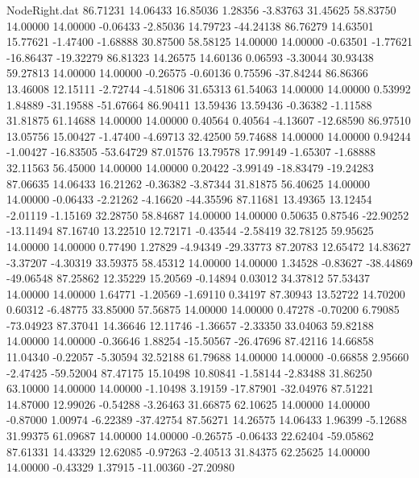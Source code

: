 \begin{filecontents}{NodeRight.dat}
  86.71231   14.06433   16.85036     1.28356   -3.83763   31.45625   58.83750   14.00000   14.00000   -0.06433   -2.85036   14.79723  -44.24138
  86.76279   14.63501   15.77621    -1.47400   -1.68888   30.87500   58.58125   14.00000   14.00000   -0.63501   -1.77621  -16.86437  -19.32279
  86.81323   14.26575   14.60136     0.06593   -3.30044   30.93438   59.27813   14.00000   14.00000   -0.26575   -0.60136    0.75596  -37.84244
  86.86366   13.46008   12.15111    -2.72744   -4.51806   31.65313   61.54063   14.00000   14.00000    0.53992    1.84889  -31.19588  -51.67664
  86.90411   13.59436   13.59436    -0.36382   -1.11588   31.81875   61.14688   14.00000   14.00000    0.40564    0.40564   -4.13607  -12.68590
  86.97510   13.05756   15.00427    -1.47400   -4.69713   32.42500   59.74688   14.00000   14.00000    0.94244   -1.00427  -16.83505  -53.64729
  87.01576   13.79578   17.99149    -1.65307   -1.68888   32.11563   56.45000   14.00000   14.00000    0.20422   -3.99149  -18.83479  -19.24283
  87.06635   14.06433   16.21262    -0.36382   -3.87344   31.81875   56.40625   14.00000   14.00000   -0.06433   -2.21262   -4.16620  -44.35596
  87.11681   13.49365   13.12454    -2.01119   -1.15169   32.28750   58.84687   14.00000   14.00000    0.50635    0.87546  -22.90252  -13.11494
  87.16740   13.22510   12.72171    -0.43544   -2.58419   32.78125   59.95625   14.00000   14.00000    0.77490    1.27829   -4.94349  -29.33773
  87.20783   12.65472   14.83627    -3.37207   -4.30319   33.59375   58.45312   14.00000   14.00000    1.34528   -0.83627  -38.44869  -49.06548
  87.25862   12.35229   15.20569    -0.14894    0.03012   34.37812   57.53437   14.00000   14.00000    1.64771   -1.20569   -1.69110    0.34197
  87.30943   13.52722   14.70200     0.60312   -6.48775   33.85000   57.56875   14.00000   14.00000    0.47278   -0.70200    6.79085  -73.04923
  87.37041   14.36646   12.11746    -1.36657   -2.33350   33.04063   59.82188   14.00000   14.00000   -0.36646    1.88254  -15.50567  -26.47696
  87.42116   14.66858   11.04340    -0.22057   -5.30594   32.52188   61.79688   14.00000   14.00000   -0.66858    2.95660   -2.47425  -59.52004
  87.47175   15.10498   10.80841    -1.58144   -2.83488   31.86250   63.10000   14.00000   14.00000   -1.10498    3.19159  -17.87901  -32.04976
  87.51221   14.87000   12.99026    -0.54288   -3.26463   31.66875   62.10625   14.00000   14.00000   -0.87000    1.00974   -6.22389  -37.42754
  87.56271   14.26575   14.06433     1.96399   -5.12688   31.99375   61.09687   14.00000   14.00000   -0.26575   -0.06433   22.62404  -59.05862
  87.61331   14.43329   12.62085    -0.97263   -2.40513   31.84375   62.25625   14.00000   14.00000   -0.43329    1.37915  -11.00360  -27.20980

\end{filecontents}
